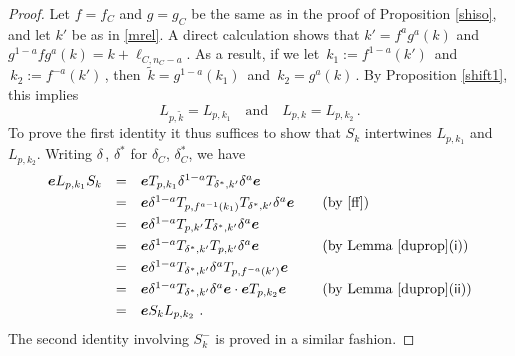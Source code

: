 \documentclass{amsart}
\newtheorem{theorem}{Theorem}[section]
\theoremstyle{definition}
\theoremstyle{remark}
\numberwithin{equation}{section}
\begin{document}
\begin{proof} Let $f=f_C$ and $g=g_C$ be the same as in the proof of Proposition \ref{shiso},
and let $k'$ be as in \eqref{mrel}. A direct calculation shows that $k'=f^{a}g^{a}(k)$ and
$g^{1-a}fg^{a}(k)=k+\ell_{C,n_C-a}$. As a result, if we let $\, k_1:=f^{1-a}(k') \,$
and $\, k_2:=f^{-a}(k')\,$, then $\,\widetilde{k} = g^{1-a}(k_1)\,$ and $\,k_2=g^{a}(k)\,$.
By Proposition \ref{shift1}, this implies
\begin{equation*}
L_{p,\widetilde k}=L_{p,k_1}\quad\text{and}\quad
L_{p,k}=L_{p,k_2}\,.
\end{equation*}
To prove the first identity it thus suffices to show that $S_k$
intertwines $L_{p,k_1}$ and $L_{p,k_2}$. Writing $\delta \,$, $\delta^*$ for $\delta_C $, $\delta_C^*$,
we have
\begin{equation*}
\begin{array}{llll}
{\boldsymbol{e}} L_{p,k_1}S_k &=& {\boldsymbol{e}} T_{p,k_1}\delta^{1-a}T_{\delta^*, k'}\delta^{a}{\boldsymbol{e}} &\quad   \\*[.8ex]
                &=& {\boldsymbol{e}}\delta^{1-a}T_{p,f^{a-1}(k_1)}T_{\delta^*, k'}\delta^{a}{\boldsymbol{e}} &\quad \mbox{(by \eqref{ff})}  \\*[.8ex]
                &=& {\boldsymbol{e}}\delta^{1-a}T_{p,k'}T_{\delta^*,k'}\delta^{a}{\boldsymbol{e}} & \quad \\*[.8ex]
                &=& {\boldsymbol{e}}\delta^{1-a}T_{\delta^*,k'}T_{p,k'}\delta^{a}{\boldsymbol{e}} & \quad \mbox{(by Lemma~\ref{duprop}$\mathsf{(i)}$)}  \\*[.8ex]
                &=& {\boldsymbol{e}}\delta^{1-a}T_{\delta^*,k'}\delta^{a}T_{p,f^{-a}(k')}{\boldsymbol{e}} & \quad   \\*[.8ex]
                &=& {\boldsymbol{e}}\delta^{1-a}T_{\delta^*,k'}\delta^{a}{\boldsymbol{e}}\cdot {\boldsymbol{e}} T_{p,k_2}{\boldsymbol{e}} & \quad \mbox{(by Lemma~\ref{duprop}$\mathsf{(ii)}$)} \\*[.8ex]
                &=& {\boldsymbol{e}} S_k L_{p, k_2}\ . &
\end{array}
\end{equation*}
The second identity involving $S_k^-$ is proved in a similar fashion.
\end{proof}
\end{document}
